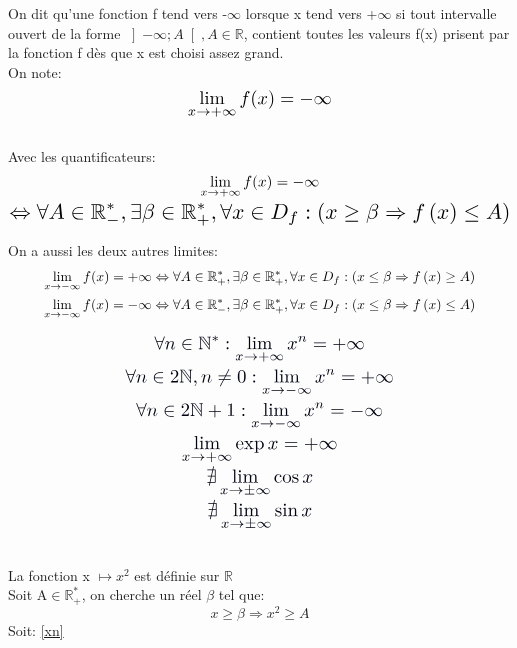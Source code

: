 \documentclass[a4paper, 10pt]{article}
\renewcommand{\large}{\color{text}}
\renewcommand{\textbf}{\color{crimson}}
\begin{document}
	\newpage
	\textbf{Définition:}
	\large On dit qu'une fonction f tend vers -$\infty$ lorsque x tend vers +$\infty$
	si tout intervalle ouvert de la forme $\left]-\infty; A\right[, A\in\mathbb{R}$, contient toutes les valeurs f(x)
	prisent par la fonction f dès que x est choisi assez grand.\\
	On note:
	\begin{displaymath}
		\scaleto{\lim_{x\to+\infty} f(x) = -\infty}{20pt}
	\end{displaymath}
	\\
	\large Avec les quantificateurs:
	\begin{gather*}
		\scaleto{\lim_{x\to+\infty} f(x) = -\infty}{20pt} 
		\\
		\scaleto{\Leftrightarrow\forall A \in\mathbb{R}_{-}^{*},\exists\beta\in\mathbb{R}_{+}^{*},\forall x \in D_{f} : \left(x\geq\beta\Rightarrow f\left(x\right)\leq A \right)}{20pt}
	\end{gather*}

	
	\begin{center}
		\vspace{30pt}
		\small On a aussi les deux autres limites:
		\begin{gather*}
			\scaleto{\lim_{x\to-\infty} f(x) = +\infty\Leftrightarrow\forall A \in\mathbb{R}_{+}^{*},\exists\beta\in\mathbb{R}_{+}^{*},\forall x \in D_{f} : \left(x\leq\beta\Rightarrow f\left(x\right)\geq A \right)}{15pt}
			\\
			\scaleto{\lim_{x\to-\infty} f(x) = -\infty\Leftrightarrow\forall A \in\mathbb{R}_{-}^{*},\exists\beta\in\mathbb{R}_{+}^{*},\forall x \in D_{f} : \left(x\leq\beta\Rightarrow f\left(x\right)\leq A \right)}{15pt}
		\end{gather*}
	\end{center}

	\vspace{30pt}
	\textbf{Propriétés (Admises):}
	\begin{gather}
		\color{text} \scaleto{\forall n\in\mathbb{N}^{*}: \lim_{x\to+\infty}x^{n}=+\infty}{20pt} \label{xn} 
		\\ \color{text} \scaleto{\forall n\in2\mathbb{N}, n\neq0: \lim_{x\to-\infty}x^{n}=+\infty}{20pt}
		\\ \color{text} \scaleto{\forall n\in2\mathbb{N}+1: \lim_{x\to-\infty}x^{n}=-{\infty}}{20pt}
		\\ \color{text} \scaleto{\lim_{x\to+\infty}\exp{x}=+\infty}{20pt}
		\\ \color{text} \scaleto{\nexists\lim_{x\to\pm\infty}\cos{x}}{20pt} 
		\\ \color{text} \scaleto{\nexists\lim_{x\to\pm\infty}\sin{x}}{20pt}
	\end{gather}

	\medskip
	\textbf{\color{darkblue} Exemple:}\\
	\large La fonction x $\mapsto x^{2}$ est définie sur $\mathbb{R}$\\
	Soit A$\in\mathbb{R}_{+}^{*}$, on cherche un réel $\beta$ tel que:
	\[ x\geq\beta\Rightarrow x^{2}\geq A\]
	Soit: 
	\ref{xn}
	
\end{document}
